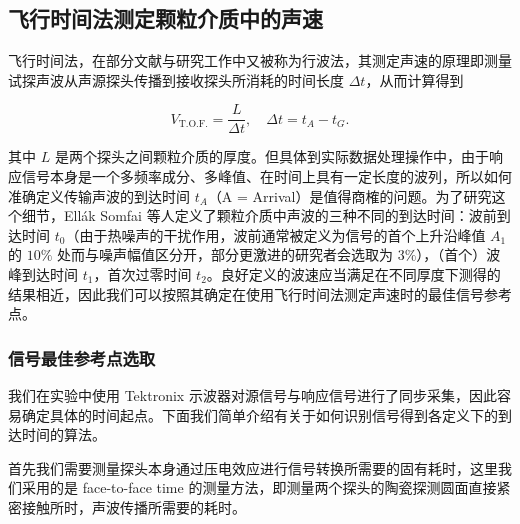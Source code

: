 \subsection{飞行时间法测定颗粒介质中的声速}

飞行时间法，在部分文献与研究工作中又被称为行波法，其测定声速的原理即测量试探声波从声源探头传播到接收探头所消耗的时间长度 $\Delta t$，从而计算得到

\begin{equation}
  V_{\text{T.O.F.}} = \frac{L}{\Delta t},\quad \Delta t = t_{A} - t_{G}.
\end{equation}

其中 $L$ 是两个探头之间颗粒介质的厚度。但具体到实际数据处理操作中，由于响应信号本身是一个多频率成分、多峰值、在时间上具有一定长度的波列，所以如何准确定义传输声波的到达时间 $t_{A}$（A = Arrival）是值得商榷的问题。为了研究这个细节，Ellák Somfai 等人定义了颗粒介质中声波的三种不同的到达时间：波前到达时间 $t_{0}$（由于热噪声的干扰作用，波前通常被定义为信号的首个上升沿峰值 $A_{1}$ 的 $10\%$ 处而与噪声幅值区分开，部分更激进的研究者会选取为 $3\%$），（首个）波峰到达时间 $t_{1}$，首次过零时间 $t_{2}$\cite{PhysRevE.72.021301}。良好定义的波速应当满足在不同厚度下测得的结果相近，因此我们可以按照其确定在使用飞行时间法测定声速时的最佳信号参考点。


\subsubsection{信号最佳参考点选取}

我们在实验中使用 Tektronix 示波器对源信号与响应信号进行了同步采集，因此容易确定具体的时间起点。下面我们简单介绍有关于如何识别信号得到各定义下的到达时间的算法。

首先我们需要测量探头本身通过压电效应进行信号转换所需要的固有耗时，这里我们采用的是 face-to-face time 的测量方法，即测量两个探头的陶瓷探测圆面直接紧密接触所时，声波传播所需要的耗时。


